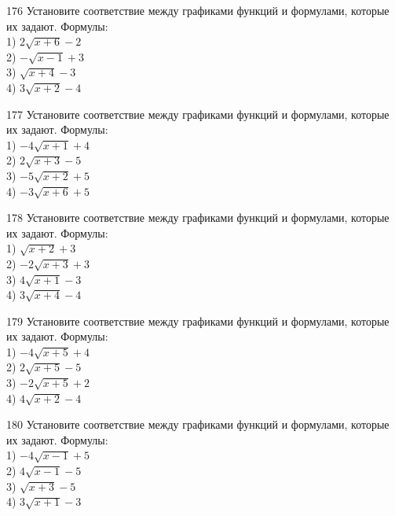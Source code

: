 \documentclass[4apaper]{article}
\begin{document}
\begin{taskBN}{176}
Установите соответствие между графиками функций и формулами, которые их задают. Формулы: \\1) $2\sqrt{x+6}-2$\\2) $-\sqrt{x-1}+3$\\3) $\sqrt{x+4}-3$\\4) $3\sqrt{x+2}-4$
\end{taskBN}

\begin{taskBN}{177}
Установите соответствие между графиками функций и формулами, которые их задают. Формулы: \\1) $-4\sqrt{x+1}+4$\\2) $2\sqrt{x+3}-5$\\3) $-5\sqrt{x+2}+5$\\4) $-3\sqrt{x+6}+5$
\end{taskBN}

\begin{taskBN}{178}
Установите соответствие между графиками функций и формулами, которые их задают. Формулы: \\1) $\sqrt{x+2}+3$\\2) $-2\sqrt{x+3}+3$\\3) $4\sqrt{x+1}-3$\\4) $3\sqrt{x+4}-4$
\end{taskBN}

\begin{taskBN}{179}
Установите соответствие между графиками функций и формулами, которые их задают. Формулы: \\1) $-4\sqrt{x+5}+4$\\2) $2\sqrt{x+5}-5$\\3) $-2\sqrt{x+5}+2$\\4) $4\sqrt{x+2}-4$
\end{taskBN}

\begin{taskBN}{180}
Установите соответствие между графиками функций и формулами, которые их задают. Формулы: \\1) $-4\sqrt{x-1}+5$\\2) $4\sqrt{x-1}-5$\\3) $\sqrt{x+3}-5$\\4) $3\sqrt{x+1}-3$
\end{taskBN}
\end{document}
